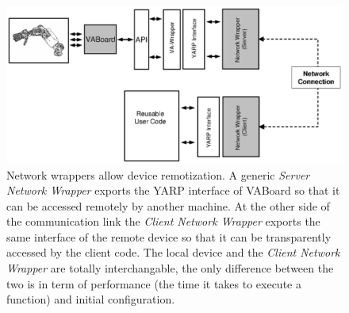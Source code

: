 



\begin{figure}[tbp]
\centerline{
\includegraphics[width=24cm]{fig-devices3}
}
\caption{Network wrappers allow device remotization. A generic 
\emph{Server Network Wrapper} exports the YARP interface of VABoard so 
that it can be accessed remotely by another machine. At the 
other side of the 
communication link the \emph{Client Network Wrapper} exports the same 
interface of the remote device so that it can be transparently accessed 
by the client code. The local device and the \emph{Client Network Wrapper}
 are totally interchangable, the only difference between the two is in 
term of performance (the time it takes to execute a function) and
initial configuration.
}\label{fig:devices3}
\end{figure}



